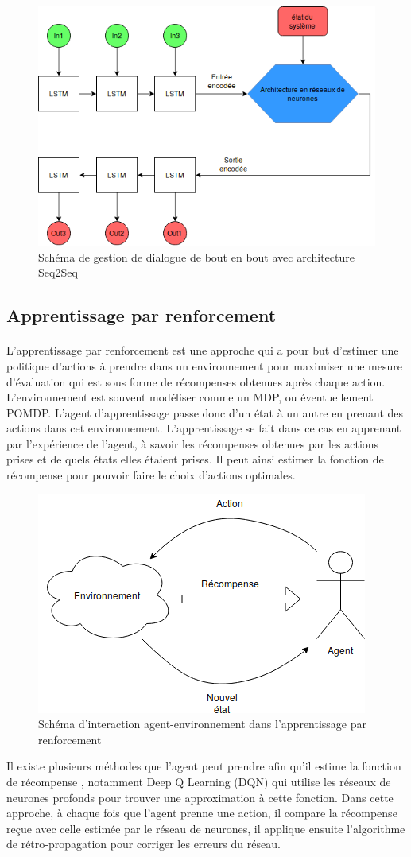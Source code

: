 \begin{figure}[H]
	\centering
	\includegraphics[width=.7\linewidth]{images/DM/DMSeq2Seq.png} 
	\caption{Schéma de gestion de dialogue de bout en bout avec architecture Seq2Seq} 
\end{figure}
\subsection{Apprentissage par renforcement} \label{reinf_learning}
\paragraph{}
L’apprentissage par renforcement est une approche qui a pour but d’estimer une politique d’actions à prendre dans un environnement pour maximiser une mesure d’évaluation qui est sous forme de récompenses obtenues après chaque action\cite{Weisz2018}. L’environnement est souvent modéliser comme un MDP, ou éventuellement POMDP. L’agent d’apprentissage passe donc d’un état à un autre en prenant des actions dans cet environnement. L’apprentissage se fait dans ce cas en apprenant par l’expérience de l’agent, à savoir les récompenses obtenues par les actions prises et de quels états elles étaient prises. Il peut ainsi estimer la fonction de récompense pour pouvoir faire le choix d’actions optimales. 

\begin{figure}[H]
	\centering
	\includegraphics[width=.5\linewidth]{images/DM/RLSchema.png} 
	\caption{Schéma d'interaction agent-environnement dans l'apprentissage par renforcement} 
\end{figure}
Il existe plusieurs méthodes que l’agent peut prendre afin qu’il estime la fonction de récompense \cite{Dimitri2012}, notamment Deep Q Learning (DQN) \cite{Mnih2015} qui utilise les réseaux de neurones profonds pour trouver une approximation à cette fonction. Dans cette approche, à chaque fois que l'agent prenne une action, il compare la récompense reçue avec celle estimée par le réseau de neurones, il applique ensuite l'algorithme de rétro-propagation pour corriger les erreurs du réseau. 

